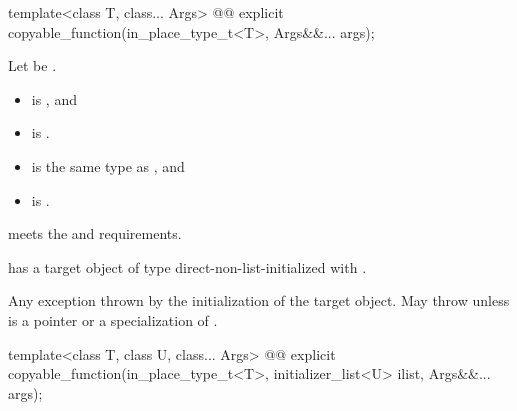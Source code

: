 %
\begin{itemdecl}
template<class T, class... Args>
  @@ explicit copyable_function(in_place_type_t<T>, Args&&... args);
\end{itemdecl}

\begin{itemdescr}
\pnum
Let  be .

\pnum
\constraints
\begin{itemize}
\item {} is , and
\item {} is .
\end{itemize}

\pnum
\mandates
\begin{itemize}
\item {} is the same type as , and
\item {} is .
\end{itemize}

\pnum
\expects
{} meets the  and  requirements.

\pnum
\ensures
{} has a target object of type  direct-non-list-initialized with .

\pnum
\throws
Any exception thrown by the initialization of the target object. May throw  unless  is a pointer or a specialization of .
\end{itemdescr}

%
\begin{itemdecl}
template<class T, class U, class... Args>
  @@ explicit copyable_function(in_place_type_t<T>, initializer_list<U> ilist, Args&&... args);
\end{itemdecl}

